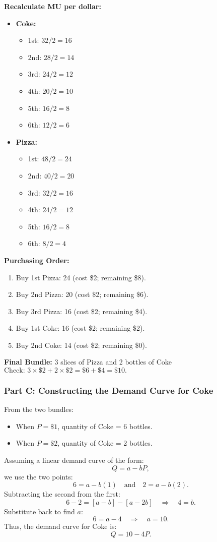 \documentclass[12pt]{article}
\begin{document}
\textbf{Recalculate MU per dollar:}
\begin{itemize}[noitemsep]
    \item \textbf{Coke:}
          \begin{itemize}[noitemsep]
              \item 1st: \(32/2 = 16\)
              \item 2nd: \(28/2 = 14\)
              \item 3rd: \(24/2 = 12\)
              \item 4th: \(20/2 = 10\)
              \item 5th: \(16/2 = 8\)
              \item 6th: \(12/2 = 6\)
          \end{itemize}
    \item \textbf{Pizza:}
          \begin{itemize}[noitemsep]
              \item 1st: \(48/2 = 24\)
              \item 2nd: \(40/2 = 20\)
              \item 3rd: \(32/2 = 16\)
              \item 4th: \(24/2 = 12\)
              \item 5th: \(16/2 = 8\)
              \item 6th: \(8/2 = 4\)
          \end{itemize}
\end{itemize}
\textbf{Purchasing Order:}
\begin{enumerate}[noitemsep]
    \item Buy 1st Pizza: 24 (cost \$2; remaining \$8).
    \item Buy 2nd Pizza: 20 (cost \$2; remaining \$6).
    \item Buy 3rd Pizza: 16 (cost \$2; remaining \$4).
    \item Buy 1st Coke: 16 (cost \$2; remaining \$2).
    \item Buy 2nd Coke: 14 (cost \$2; remaining \$0).
\end{enumerate}
\textbf{Final Bundle:} 3 slices of Pizza and 2 bottles of Coke \\
\(\text{Check: } 3 \times \$2 + 2 \times \$2 = \$6 + \$4 = \$10.\)

\subsubsection*{Part C: Constructing the Demand Curve for Coke}
From the two bundles:
\begin{itemize}[noitemsep]
    \item When \(P = \$1\), quantity of Coke = 6 bottles.
    \item When \(P = \$2\), quantity of Coke = 2 bottles.
\end{itemize}
Assuming a linear demand curve of the form:
\[
    Q = a - bP,
\]
we use the two points:
\[
    6 = a - b(1) \quad \text{and} \quad 2 = a - b(2).
\]
Subtracting the second from the first:
\[
    6 - 2 = [a - b] - [a - 2b] \quad \Longrightarrow \quad 4 = b.
\]
Substitute back to find \(a\):
\[
    6 = a - 4 \quad \Longrightarrow \quad a = 10.
\]
Thus, the demand curve for Coke is:
\[
    Q = 10 - 4P.
\]
\end{document}
